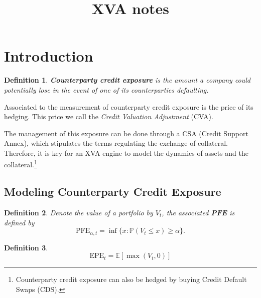 \documentclass[]{article}
\title{XVA notes}
\author{}
\newcommand{\PP}{{\mathbb P}}
\newcommand{\EE}{{\mathbb E}}
\newtheorem{definition}{Definition}
\begin{document}
\maketitle


\section{Introduction}
\begin{definition}
	\textbf{Counterparty credit exposure} is the amount a company could potentially lose in the event of one of its counterparties defaulting.
\end{definition}
Associated to the measurement of counterparty credit exposure is the price of its hedging. This price we call the \textit{Credit Valuation Adjustment} (CVA).

The management of this exposure can be done through a CSA (Credit Support Annex), which stipulates the terms regulating the exchange of collateral. Therefore, it is key for an XVA engine to model the dynamics of assets and the collateral.\footnote{Counterparty credit exposure can also be hedged by buying Credit Default Swaps (CDS).}

\subsection{Modeling Counterparty Credit Exposure}
\begin{definition}
	Denote the value of a portfolio by $V_t$, the associated \textbf{PFE} is defined by
	\[
	\text{PFE}_{\alpha, t} = \inf \{x : \PP(V_t \leq x) \geq \alpha \}.
	\]
\end{definition}

\begin{definition}
	\[
	\text{EPE}_t = \EE [ \max(V_t , 0)]
	\]
\end{definition}
\end{document}

